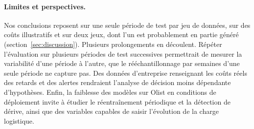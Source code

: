 \documentclass[11pt,a4paper]{article}
\theoremstyle{definition}
\begin{document}
\paragraph{Limites et perspectives.} Nos conclusions reposent sur une seule période de test par jeu de données, sur des coûts illustratifs et sur deux jeux, dont l'un est probablement en partie généré (section~\ref{sec:discussion}). Plusieurs prolongements en découlent. Répéter l'évaluation sur plusieurs périodes de test successives permettrait de mesurer la variabilité d'une période à l'autre, que le rééchantillonnage par semaines d'une seule période ne capture pas. Des données d'entreprise renseignant les coûts réels des retards et des alertes rendraient l'analyse de décision moins dépendante d'hypothèses. Enfin, la faiblesse des modèles sur Olist en conditions de déploiement invite à étudier le réentraînement périodique et la détection de dérive, ainsi que des variables capables de saisir l'évolution de la charge logistique.



\end{document}
